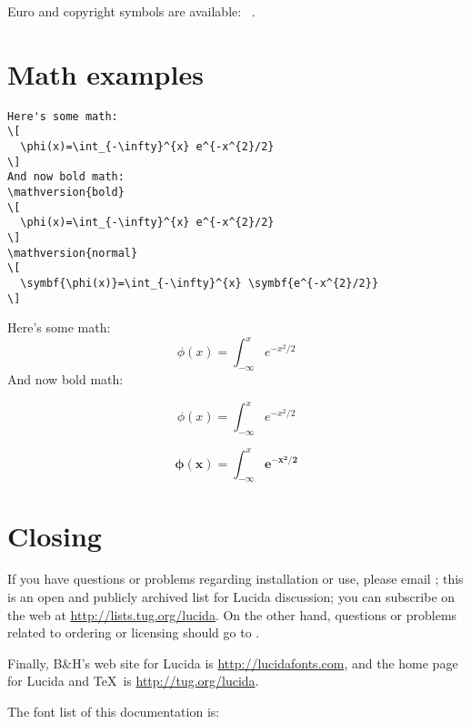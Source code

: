 \documentclass[11pt]{article}
\begin{document}
Euro and copyright symbols are available: \texteuro\ \textcopyright.

\section{Math examples}

\begin{verbatim}
Here's some math:
\[ 
  \phi(x)=\int_{-\infty}^{x} e^{-x^{2}/2} 
\]
And now bold math:
\mathversion{bold}
\[ 
  \phi(x)=\int_{-\infty}^{x} e^{-x^{2}/2} 
\]
\mathversion{normal}
\[ 
  \symbf{\phi(x)}=\int_{-\infty}^{x} \symbf{e^{-x^{2}/2}}
\]
\end{verbatim}


Here's some math:
\[ 
  \phi(x)=\int_{-\infty}^{x} e^{-x^{2}/2} 
\]
And now bold math:

\[ 
  \phi(x)=\int_{-\infty}^{x} e^{-x^{2}/2} 
\]

\[ 
  \symbf{\phi(x)}=\int_{-\infty}^{x} \symbf{e^{-x^{2}/2}}
\]



\section{Closing}

If you have questions or problems regarding installation or use, please
email ; this is an open and publicly archived list
for Lucida discussion; you can subscribe on the web at
\url{http://lists.tug.org/lucida}.  On the other hand, questions or
problems related to ordering or licensing should go to
.

Finally, B\&H's web site for Lucida is \url{http://lucidafonts.com},
and the home page for Lucida and \TeX\ is \url{http://tug.org/lucida}.

The font list of this documentation is:

\footnotesize\ttfamily
\expandafter\IfFileExists\expandafter{\jobname.txt}%
  {}{}

\normalfont\rmfamily

\nocite{*}
\printbibliography
\end{document}
